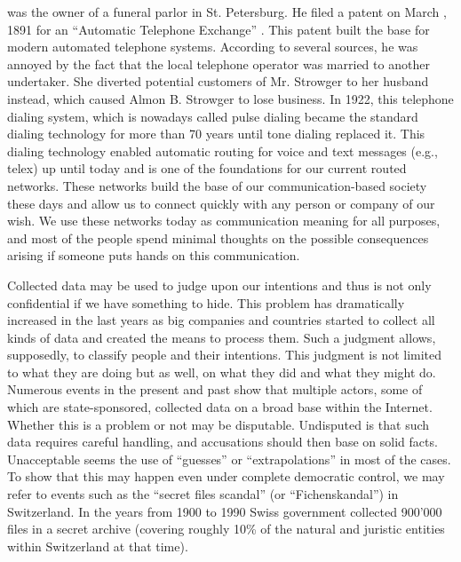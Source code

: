 \documentclass[10pt,journal,compsoc,twocolumn,twoside]{IEEEtran}
\begin{document}
% 
% 
% 
% 
 was the owner of a funeral parlor in St. Petersburg. He filed a patent on March , 1891 for an ``Automatic Telephone Exchange'' \cite{pulseDialingPatent}. This patent built the base for modern automated telephone systems. According to several sources, he was annoyed by the fact that the local telephone operator was married to another undertaker. She diverted potential customers of Mr. Strowger to her husband instead, which caused Almon B. Strowger to lose business. In 1922, this telephone dialing system, which is nowadays called pulse dialing became the standard dialing technology for more than 70 years until tone dialing replaced it. This dialing technology enabled automatic routing for voice and text messages (e.g., telex) up until today and is one of the foundations for our current routed networks. These networks build the base of our communication-based society these days and allow us to connect quickly with any person or company of our wish. We use these networks today as communication meaning for all purposes, and most of the people spend minimal thoughts on the possible consequences arising if someone puts hands on this communication. 

Collected data may be used to judge upon our intentions and thus is not only confidential if we have something to hide. This problem has dramatically increased in the last years as big companies and countries started to collect all kinds of data and created the means to process them. Such a judgment allows, supposedly, to classify people and their intentions. This judgment is not limited to what they are doing but as well, on what they did and what they might do. Numerous events in the present and past show that multiple actors, some of which are state-sponsored, collected data on a broad base within the Internet. Whether this is a problem or not may be disputable. Undisputed is that such data requires careful handling, and accusations should then base on solid facts. Unacceptable seems the use of ``guesses'' or ``extrapolations'' in most of the cases. To show that this may happen even under complete democratic control, we may refer to events such as the ``secret files scandal'' (or  ``Fichenskandal'') in Switzerland. In the years from 1900 to 1990 Swiss government collected 900’000 files in a secret archive (covering roughly 10\% of the natural and juristic entities within Switzerland at that time)\cite{Leuenberger1989}.
\end{document}
